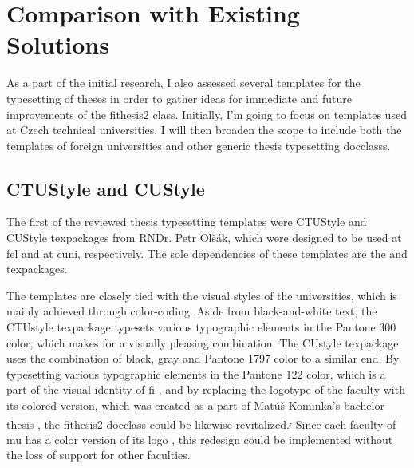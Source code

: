 \documentclass[12pt,twoside,cover,color,table]%
  {fithesis3/fithesis3/fithesis3} %
\begin{document}
  \section{Comparison with Existing Solutions}
  As a part of the initial research, I also assessed several
  templates for the typesetting of theses in order to gather ideas
  for immediate and future improvements of the \textsf{fithesis2}
  class.  Initially, I'm going to focus on templates used at Czech
  technical universities. I will then broaden the scope to include
  both the templates of foreign universities and other generic
  thesis typesetting \glspl{docclass}.

  \subsection{CTUStyle and
    CUStyle}\label{sec:ctu&custyle}
  The first of the reviewed thesis typesetting templates were
  CTUStyle \cite{ctustyle} and CUStyle \cite{custyle}
  \glspl{texpackage} from RNDr. Petr Olšák, which were designed to
  be used at \gls{fel} and at \gls{cuni}, respectively. The sole
  dependencies of these templates are the  and
   \glspl{texpackage}.

  The templates are closely tied with the visual styles of the
  universities, which is mainly achieved through color-coding.
  Aside from black-and-white text, the CTUstyle \gls{texpackage}
  typesets various typographic elements in the
   Pantone 300 color, which makes for a
  visually pleasing combination. The CUstyle \gls{texpackage} uses
  the combination of black, gray and  Pantone 1797
  color to a similar end. By typesetting various typographic
  elements in the  Pantone 122 color, which
  is a part of the visual identity of \gls{fi} \cite{filogo}, and
  by replacing the logotype of the faculty with its colored
  version, which was created as a part of Matúš Kominka's bachelor
  thesis \cite{Kominka08}, the \textsf{fithesis2} \gls{docclass}
  could be likewise revitalized.\textsuperscript{,} Since each faculty of \gls{mu} has a color version of
  its logo \cite{muvis}, this redesign could be implemented without
  the loss of support for other faculties.
\end{document}
